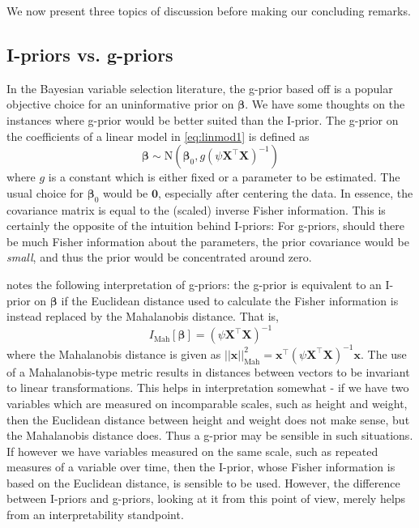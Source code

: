 

We now present three topics of discussion before making our concluding remarks. 

\subsection{I-priors vs. g-priors}
\label{sec:gprior}

In the Bayesian variable selection literature, the g-prior based off \cite{Zellner1986} is a popular objective choice for an uninformative prior on $\boldsymbol\beta$. We have some thoughts on the instances where g-prior would be better suited than the I-prior. The g-prior on the coefficients of a linear model in \eqref{eq:linmod1} is defined as
\[
	\boldsymbol\beta \sim \text{N}(\boldsymbol\beta_0, g(\psi\mathbf X^\top \mathbf X)^{-1})
\]
where $g$ is a constant which is either fixed or a parameter to be estimated. The usual choice for $\boldsymbol\beta_0$ would be $\mathbf 0$, especially after centering the data. In essence, the covariance matrix is equal to the (scaled) inverse Fisher information. This is certainly the opposite of the intuition behind  I-priors: For g-priors, should there be much Fisher information about the parameters, the prior covariance would be \textit{small}, and thus the prior would be concentrated around zero.

\cite{Bergsma2014} notes the following interpretation of g-priors: the g-prior is equivalent to an I-prior on $\boldsymbol\beta$ if the Euclidean distance used to calculate the Fisher information is instead replaced by the Mahalanobis distance. That is, 
\[
	I_{\text{Mah}}[\boldsymbol\beta] = (\psi\mathbf X^\top \mathbf X)^{-1}
\]
where the Mahalanobis distance is given as $||\mathbf x||^2_{\text{Mah}} = \mathbf x^\top (\psi\mathbf X^\top \mathbf X)^{-1} \mathbf x$. The use of a Mahalanobis-type metric results in distances between vectors to be invariant to linear transformations. This helps in interpretation somewhat - if we have two variables which are measured on incomparable scales, such as height and weight, then the Euclidean distance between height and weight does not make sense, but the Mahalanobis distance does. Thus a g-prior may be sensible in such situations. If however we have variables measured on the same scale, such as repeated measures of a variable over time, then the I-prior, whose Fisher information is based on the Euclidean distance, is sensible to be used. However, the difference between I-priors and g-priors, looking at it from this point of view, merely helps from an interpretability standpoint. 

